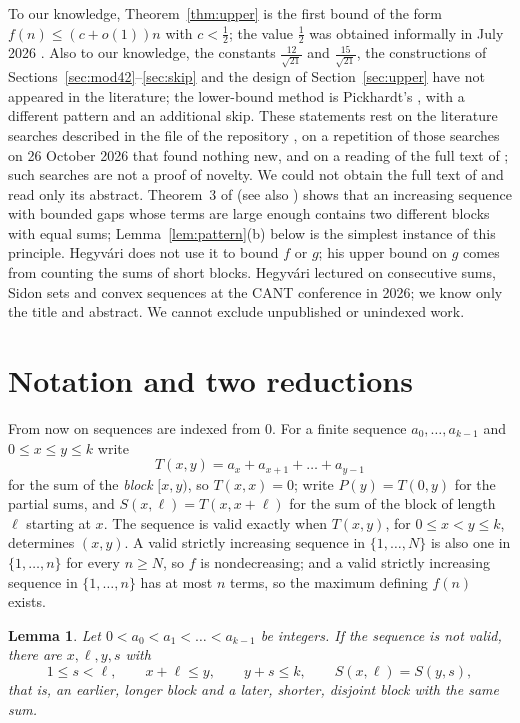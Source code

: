 \documentclass[11pt]{amsart}
\newtheorem{lemma}[theorem]{Lemma}
\theoremstyle{remark}
\begin{document}
To our knowledge, Theorem~\ref{thm:upper} is the first bound of the form $f(n)\le(c+o(1))n$ with $c<\frac12$; the value $\frac12$
was obtained informally in July 2026 \cite{EPDay2026,Pickhardt2026,EP357claims}. Also to our knowledge, the constants
$\frac{12}{\sqrt{21}}$ and $\frac{15}{\sqrt{21}}$, the constructions of Sections~\ref{sec:mod42}--\ref{sec:skip} and the design of Section~\ref{sec:upper} have not appeared in
the literature; the lower-bound method is Pickhardt's \cite{Pickhardt2026}, with a different pattern and an additional skip. These
statements rest on the literature searches described in the file  of the repository \cite{Artifact}, on a
repetition of those searches on 26 October 2026 that found nothing new, and on a reading of the full text of \cite{Hegyvari1986}; such
searches are not a proof of novelty. We could not obtain the full text of \cite{CoppersmithPhillips1996} and read only its abstract.
Theorem~3 of \cite{Hegyvari1986} (see also \cite{EP1213}) shows that an increasing sequence with bounded gaps whose terms are large
enough contains two different blocks with equal sums; Lemma~\ref{lem:pattern}(b) below is the simplest instance of this principle.
Hegyv\'ari does not use it to bound $f$ or $g$; his upper bound on $g$ comes from counting the sums of short blocks. Hegyv\'ari lectured on consecutive sums,
Sidon sets and convex sequences at the CANT conference in 2026; we know only the title and abstract. We cannot exclude unpublished or
unindexed work.

\section{Notation and two reductions}\label{sec:notation}

From now on sequences are indexed from $0$. For a finite sequence $a_0,\dots,a_{k-1}$ and $0\le x\le y\le k$ write
\[
  T(x,y)=a_x+a_{x+1}+\dots+a_{y-1}
\]
for the sum of the \emph{block} $[x,y)$, so $T(x,x)=0$; write $P(y)=T(0,y)$ for the partial sums, and $S(x,\ell)=T(x,x+\ell)$ for the
sum of the block of length $\ell$ starting at $x$. The sequence is valid exactly when $T(x,y)$, for $0\le x<y\le k$, determines
$(x,y)$. A valid strictly increasing sequence in $\{1,\dots,N\}$ is also one in $\{1,\dots,n\}$ for every $n\ge N$, so $f$ is
nondecreasing; and a valid strictly increasing sequence in $\{1,\dots,n\}$ has at most $n$ terms, so the maximum defining $f(n)$
exists.

\begin{lemma}\label{lem:ordered}
Let $0<a_0<a_1<\dots<a_{k-1}$ be integers. If the sequence is not valid, there are $x,\ell,y,s$ with
\[
  1\le s<\ell,\qquad x+\ell\le y,\qquad y+s\le k,\qquad S(x,\ell)=S(y,s),
\]
that is, an earlier, longer block and a later, shorter, disjoint block with the same sum.
\end{lemma}
\end{document}
